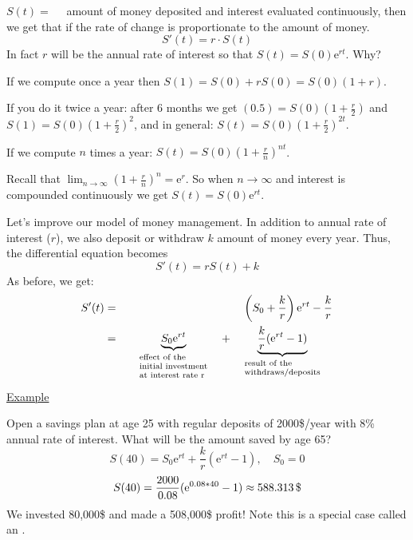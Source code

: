 \documentclass{article}
\newcommand{\comma}{{,}}
\newcommand{\mathe}{\mathrm{e}}
\newcommand{\tmscript}[1]{\text{\scriptsize{$#1$}}}
\newcommand{\tmtextit}[1]{\text{{\itshape{#1}}}}
\newcommand{\tmxspace}{\hspace{1em}}
\begin{document}
$S (t) = \tmxspace$ amount of money deposited and interest evaluated
continuously, then we get that if the rate of change is proportionate to the
amount of money.
\[ S' (t) = r \cdot S (t) \]
In fact $r$ will be the annual rate of interest so that $S (t) = S (0)
\mathe^{rt}$. Why?

If we compute once a year then $S (1) = S (0) + rS (0) = S (0)  (1 + r)$.

If you do it twice a year: after 6 months we get $(0.5) = S (0)  \left( 1 +
\frac{r}{2} \right)$ and ${S (1) = S (0)  \left( 1 + \frac{r}{2} \right)^2}$,
and in general: $S (t) = S (0)  \left( 1 + \frac{r}{2} \right)^{2 t}$.

If we compute $n$ times a year: $S (t) = S (0)  \left( 1 + \frac{r}{n}
\right)^{nt}$.

Recall that $\lim_{n \rightarrow \infty} \left( 1 + \frac{r}{n} \right)^n =
\mathe^r$. So when $n \rightarrow \infty$ and interest is compounded
continuously we get $S (t) = S (0) \mathe^{rt}$.

Let's improve our model of money management. In addition to annual rate of
interest ($r$), we also deposit or withdraw $k$ amount of money every year.
Thus, the differential equation becomes
\[ S' (t) = rS (t) + k \]
As before, we get:
\begin{eqnarray*}
  S' (t) & = & \left( S_0 + \frac{k}{r} \right) \mathe^{rt} - \frac{k}{r}\\
  & = & \underbrace{S_0 \mathe^{rt}}_{\tmscript{\begin{array}{l}
    \text{\begin{tabular}{l}
      effect of the\\
      initial investment\\
      at interest rate r
    \end{tabular}}
  \end{array}}} + \underbrace{\frac{k}{r}  (\mathe^{rt} -
  1)}_{\tmscript{\begin{array}{l}
    \text{\begin{tabular}{l}
      result of the\\
      withdraws/deposits
    \end{tabular}}
  \end{array}}}
\end{eqnarray*}
{\underline{Example}}

Open a savings plan at age 25 with regular deposits of 2000\$/year with 8\%
annual rate of interest. What will be the amount saved by age 65?
\[ S (40) = S_0 \mathe^{rt} + \frac{k}{r} (\mathe^{rt} - 1), \quad S_0 = 0 \]
\[ S (40) = \frac{2000}{0.08}  (\mathe^{0.08 \ast 40} - 1) \approx \SI{588
   \comma 313}{\$} \]
We invested 80,000\$ and made a 508,000\$ profit! Note this is a special case
called an \tmtextit{autonomous equation}.
\end{document}
